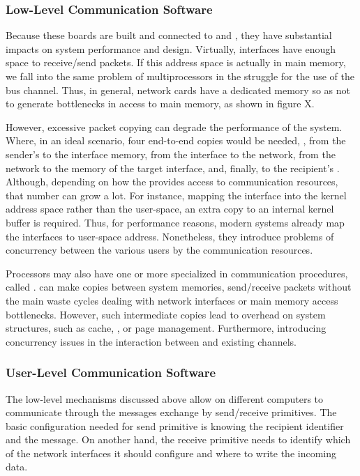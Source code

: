			\subsubsection{Low-Level Communication Software}
			\label{sec::multicomputers_low_sw}

				Because these boards are built and connected to \cpus and \ram,
				they have substantial impacts on system performance and \os design.
				Virtually, interfaces have enough \ram space to receive/send packets.
				If this address space is actually in main memory, we fall into the same
				problem of multiprocessors in the struggle for the use of the bus channel.
				Thus, in general, network cards have a dedicated memory so as not to
				generate bottlenecks in access to main memory, as shown in figure X.

				However, excessive packet copying can degrade the performance of the system.
				Where, in an ideal scenario, four end-to-end copies would be needed,
				\ei, from the sender's \ram to the interface memory, from the interface
				to the network, from the network to the memory of the target interface, and,
				finally, to the recipient's \ram.
				Although, depending on how the \os provides access to communication
				resources, that number can grow a lot.
				For instance, mapping the interface into the kernel address space
				rather than the user-space, an extra copy to an internal kernel
				buffer is required.
				Thus, for performance reasons, modern systems already map the interfaces
				to user-space address.
				Nonetheless, they introduce problems of concurrency between the various
				users by the communication resources.

				Processors may also have one or more \cpus specialized in
				communication procedures, called \dma.
				\dmas can make copies between system memories, send/receive packets
				without the main \cpus waste cycles dealing with network interfaces
				or main memory access bottlenecks.
				However, such intermediate copies lead to overhead on system structures,
				such as cache, \tlb, or page management.
				Furthermore, introducing concurrency issues in the interaction between
				\cpus and existing \dma channels.

			\subsubsection{User-Level Communication Software}
			\label{sec::multicomputers_user_sw}

				The low-level mechanisms discussed above allow \cpus on different
				computers to communicate through the messages exchange by
				send/receive primitives.
				The basic configuration needed for send primitive is knowing the
				recipient identifier and the message.
				On another hand, the receive primitive needs to identify which of
				the network interfaces it should configure and where to write the
				incoming data.

